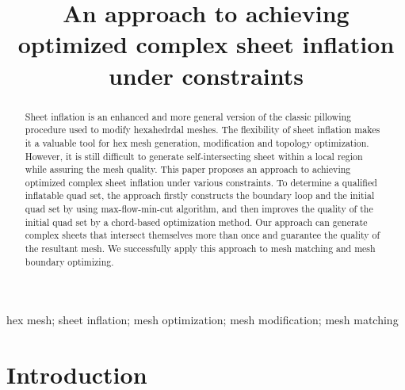 \documentclass[final,5p,times,twocolumn]{elsarticle}
\begin{document}
\begin{frontmatter}

\title{An approach to achieving optimized complex sheet inflation under constraints}


\begin{abstract}
Sheet inflation is an enhanced and more general version of the classic pillowing procedure\cite{Mitchell:1995wa} used to modify hexahedrdal meshes. The flexibility of sheet inflation makes it a valuable tool for hex mesh generation, modification and topology optimization. However, it is still difficult to generate self-intersecting sheet within a local region while assuring the mesh quality. This paper proposes an approach to achieving optimized complex sheet inflation under various constraints. To determine a qualified inflatable quad set, the approach firstly constructs the boundary loop and the initial quad set by using max-flow-min-cut algorithm, and then improves the quality of the initial quad set by a chord-based optimization method. Our approach can generate complex sheets that intersect themselves more than once and guarantee the quality of the resultant mesh. We successfully apply this approach to mesh matching and mesh boundary optimizing.
\end{abstract}

\begin{keyword}
hex mesh; sheet inflation; mesh optimization; mesh modification; mesh matching

\end{keyword}

\end{frontmatter}

\linenumbers

\section{Introduction}
\label{sec:intro}
\end{document}

